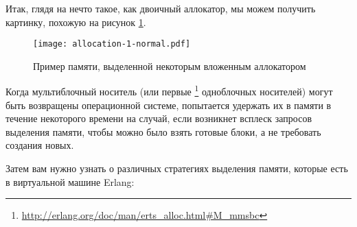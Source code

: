 Итак, глядя на нечто такое, как двоичный аллокатор, мы можем получить картинку, похожую на рисунок \ref{fig:allocation-1-normal}.

\begin{figure}
  \texttt{[image: allocation-1-normal.pdf]}%
	\caption{Пример памяти, выделенной некоторым вложенным аллокатором}
   \label{fig:allocation-1-normal}
\end{figure}
\FloatBarrier

Когда мультиблочный носитель (или первые \footnote{\href{http://erlang.org/doc/man/erts\_alloc.html\#M\_mmsbc}{http://erlang.org/doc/man/erts\_alloc.html\#M\_mmsbc}} одноблочных носителей) могут быть возвращены операционной системе,  попытается удержать их в памяти в течение некоторого времени на случай, если возникнет всплеск запросов выделения памяти, чтобы можно было взять готовые блоки, а не требовать создания новых.

Затем вам нужно узнать о различных стратегиях выделения памяти, которые есть в виртуальной машине Erlang:

